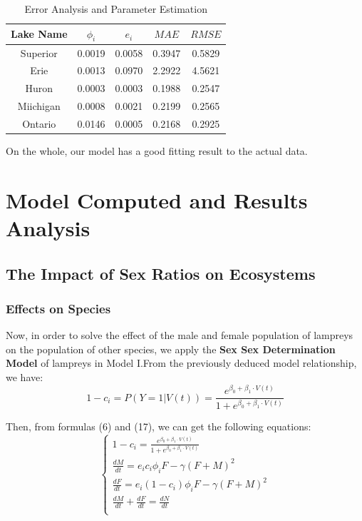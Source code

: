 \documentclass[12pt]{article}  %
\begin{document}
\begin{table}[H]
	\begin{center}
		\caption{Error Analysis and Parameter Estimation}
		\resizebox{\textwidth}{!}
		{\begin{tabular}{c c c c c}
				\toprule[2pt]
		\multicolumn{1}{m{3cm}}{\centering \textbf{Lake Name}}	&\multicolumn{1}{m{3cm}}{\centering $\phi_{i}$ }&\multicolumn{1}{m{3cm}}{\centering $e_{i}$ }&\multicolumn{1}{m{3cm}}{\centering $MAE$ }&\multicolumn{1}{m{3cm}}{\centering $RMSE$ }\\
				\midrule
				Superior & 0.0019 &0.0058 &0.3947& 0.5829\\
				Erie & 0.0013 &0.0970 & 2.2922 & 4.5621 \\
				Huron & 0.0003 &0.0003 & 0.1988 & 0.2547\\
				Miichigan & 0.0008 & 0.0021 & 0.2199 & 0.2565\\
				Ontario & 0.0146 &0.0005 &0.2168 &0.2925\\
				\bottomrule[2pt]
		\end{tabular}}
	\end{center}
\end{table}
\vspace{-0.8cm}
On the whole, our model has a good fitting result to the actual data.
\section{Model Computed and Results Analysis}
\subsection{The Impact of Sex Ratios on Ecosystems}
\subsubsection{Effects on Species}
Now, in order to solve the effect of the male and female population of lampreys on the population of other species, we apply the \textbf{Sex Sex Determination Model} of lampreys in Model I.From the previously deduced model relationship, we have:
\begin{equation}
	1-c_i=P\left( \left. Y=1 \right|V\left( t \right) \right) =\frac{e^{\beta _0+\beta _1\cdot V\left( t \right)}}{1+e^{\beta _0+\beta _1\cdot V\left( t \right)}}
\end{equation}

Then, from formulas (6) and (17), we can get the following equations:
	\begin{equation}
		\begin{cases}
			1-c_i=\frac{e^{\beta _0+\beta _1\cdot V\left( t \right)}}{1+e^{\beta _0+\beta _1\cdot V\left( t \right)}}\\
			\frac{dM}{dt}=e_{i}c_i\phi _iF-\gamma \left( F+M \right) ^2\\
			\frac{dF}{dt}=e_{i}\left( 1-c_i \right) \phi _iF-\gamma \left( F+M \right) ^2\\
			\frac{dM}{dt}+\frac{dF}{dt}=\frac{dN}{dt}\\
		\end{cases}
	\end{equation}
\end{document}
